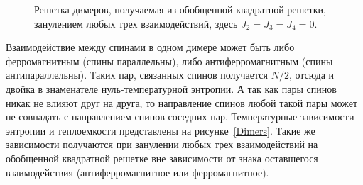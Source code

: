\documentclass[utf8,12pt]{jetp}
\begin{document}
\begin{figure}[h]
	\caption{Решетка димеров, получаемая из обобщенной квадратной решетки, занулением любых трех взаимодействий, здесь $J_2 = J_3 = J_4 = 0$.}
	\label{dimerLattice}
\end{figure}

Взаимодействие между спинами в одном димере может быть либо ферромагнитным (спины параллельны), либо антиферромагнитным (спины антипараллельны). Таких пар, связанных спинов получается $N/2$, отсюда и двойка в знаменателе нуль-температурной энтропии. А так как пары спинов никак не влияют друг на друга, то направление спинов любой такой пары может не совпадать с направлением спинов соседних пар. Температурные зависимости энтропии и теплоемкости представлены на рисунке~\ref{Dimers}. Такие же зависимости получаются при занулении любых трех взаимодействий на обобщенной квадратной решетке вне зависимости от знака оставшегося взаимодействия (антиферромагнитное или ферромагнитное).
\end{document}
